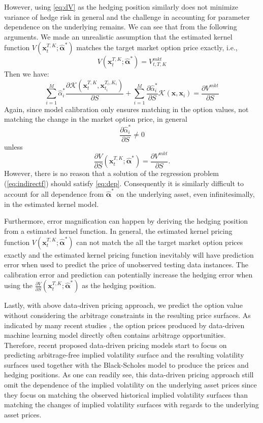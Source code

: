 \documentclass[letterpaper,12pt,titlepage,oneside,final]{book}
\numberwithin{equation}{section}
\theoremstyle{definition}
\newcommand{\vx}{\mathbf{x}}
\newcommand{\valpha}{\pmb{\widehat{\alpha}}}
\newcommand{\Vmkt}{V^{mkt}}
\begin{document}
However, using \eqref{eq:dV} as the hedging position similarly does not minimize variance of hedge risk in general and the challenge in accounting for parameter dependence on the underlying remains. We can see that from the  following arguments. We made an unrealistic assumption that the estimated kernel function $V(\mathbf{x}_{t}^{T,K};\valpha^*)$ matches the target market option price exactly, i.e.,
$$
V(\mathbf{x}_{t}^{T,K};\valpha^*) = \Vmkt_{t,T,K}
$$
Then we have:
$$
\sum_{i=1}^M \widehat{\alpha}^*_i \frac{\partial \mathcal{K}(\mathbf{x}_{t}^{T,K},\vx_{t_i}^{T_i,K_i})}{\partial S} + \sum_{i=1}^M \frac{\partial \widehat{\alpha}^*_i}{\partial S}\mathcal{K}(\vx,\vx_i)=\frac{\partial \Vmkt}{\partial S}
$$
Again, since model calibration  only ensures matching in the option values, not matching the change
in the market option price, in general
$$
\frac{\partial \widehat{\alpha}^*_i}{\partial S} \neq 0
$$
unless
\begin{equation}\label{eq:dep}
\frac{\partial V}{\partial S}(\vx_{t}^{T,K};\valpha^*) = \frac{\partial  \Vmkt}{\partial S}.
\end{equation}
However, there is no reason that a solution of the regression problem (\ref{eq:indirectf}) should satisfy \eqref{eq:dep}. Consequently it is similarly difficult to account for all dependence from $\valpha^*$ on the underlying asset, even infinitesimally, in the estimated kernel model.



Furthermore, error magnification can happen by deriving the hedging position from a estimated kernel function. In general, the estimated kernel pricing function $V(\mathbf{x}_{t}^{T,K};\valpha^*)$ can not match the all the target market option prices exactly and the  estimated kernel pricing function inevitably will have prediction error when used to predict the price of unobserved testing data instances. The calibration error and prediction can potentially increase the hedging error when using the $\frac{\partial V}{\partial S}(\vx_{t}^{T,K};\valpha^*)$ as the hedging position.

Lastly, with above data-driven pricing approach, we predict the option value  without considering the arbitrage constraints in the resulting price surfaces. As indicated by many recent studies \cite{cao2021option,zheng2021incorporating,liu2019pricing}, the option prices produced by  data-driven machine learning model directly often contains arbitrage opportunities. Therefore, recent proposed data-driven pricing models \cite{cao2021option,zheng2021incorporating,liu2019pricing} start to focus on predicting arbitrage-free implied volatility surface and the resulting volatility surfaces used together with the Black-Scholes model to produce the prices and hedging positions. As one can readily see, this data-driven pricing approach still omit the dependence of the implied volatility on the underlying asset prices since they focus on matching the observed historical implied volatility surfaces than matching the changes of implied volatility surfaces with regards to the underlying asset prices.
\end{document}
